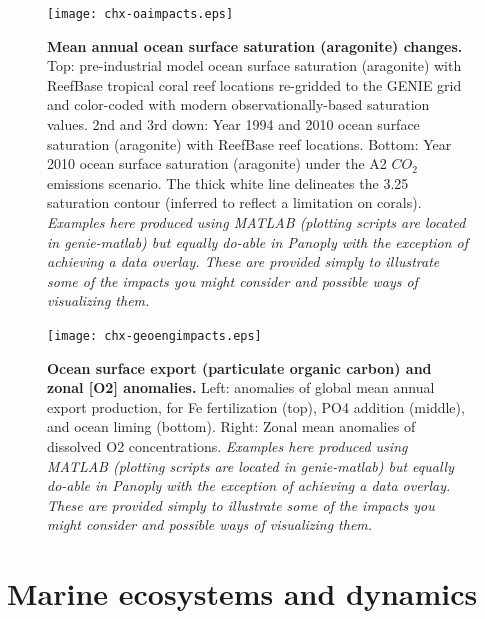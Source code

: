 \documentclass[11pt,fleqn]{book} %
\begin{document}
\begin{figure}[ht]
\begin{center}
\texttt{[image: chx-oaimpacts.eps]}
\end{center}
\caption{
\textbf{Mean annual ocean surface saturation (aragonite) changes.}
Top: pre-industrial model ocean surface saturation (aragonite) with ReefBase tropical coral reef locations re-gridded to the GENIE grid and color-coded with modern observationally-based saturation values.
2nd and 3rd down: Year 1994 and 2010 ocean surface saturation (aragonite) with ReefBase reef locations.
Bottom: Year 2010 ocean surface saturation (aragonite) under the A2 \(CO_{2}\) emissions scenario.
The thick white line delineates the 3.25 saturation contour (inferred to reflect a limitation on corals).
\textit{Examples here produced using MATLAB (plotting scripts are located in genie-matlab) but equally do-able in Panoply with the exception of achieving a data overlay. These are provided simply to illustrate some of the impacts you might consider and possible ways of visualizing them.}
}
\label{fig:chx-oaimpacts}
\end{figure}

\begin{figure}[ht]
\begin{center}
\texttt{[image: chx-geoengimpacts.eps]}
\end{center}
\caption{
\textbf{Ocean surface export (particulate organic carbon) and zonal [O2] anomalies.}
Left: anomalies of global mean annual export production, for Fe fertilization (top), PO4 addition (middle), and ocean liming (bottom).
Right: Zonal mean anomalies of dissolved O2 concentrations.
\textit{Examples here produced using MATLAB (plotting scripts are located in genie-matlab) but equally do-able in Panoply with the exception of achieving a data overlay. These are provided simply to illustrate some of the impacts you might consider and possible ways of visualizing them.}
}
\label{fig:chx-geoengimpacts}
\end{figure}


\cleardoublepage


\chapter{Marine ecosystems and dynamics}
\end{document}

